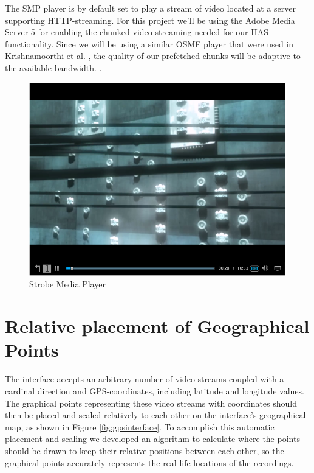 The SMP player is by default set to play a stream of video located at a server supporting HTTP-streaming. For this project we'll be using the Adobe Media Server 5 for enabling the chunked video streaming needed for our HAS functionality. Since we will be using a similar OSMF player that were used in Krishnamoorthi et al. \cite{hasmultipath}, the quality of our prefetched chunks will be adaptive to the available bandwidth. \cite{hasmultipath}.

\begin{figure}[t!]
\begin{center}
	\includegraphics[scale=0.5]{Media_player.png}
	\caption{Strobe Media Player}
	\label{fig:mediaplayer}
\end{center}
\end{figure}

\section{Relative placement of Geographical Points}
\label{sec:relativeplacement}

The interface accepts an arbitrary number of video streams coupled with a cardinal direction and GPS-coordinates, including latitude and longitude values. The graphical points representing these video streams with coordinates should then be placed and scaled relatively to each other on the interface's geographical map, as shown in Figure \ref{fig:gpsinterface}. To accomplish this automatic placement and scaling we developed an algorithm to calculate where the points should be drawn to keep their relative positions between each other, so the graphical points accurately represents the real life locations of the recordings.

